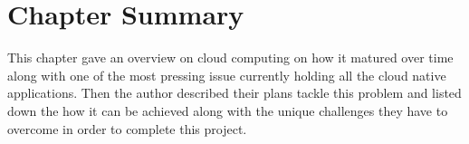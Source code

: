 \section{Chapter Summary}

This chapter gave an overview on cloud computing on how it matured over time along with one of the most pressing issue currently holding all the cloud native applications. Then the author described their plans tackle this problem and listed down the how it can be achieved along with the unique challenges they have to overcome in order to complete this project.

